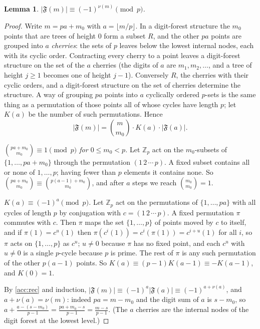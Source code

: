 \documentclass[11pt]{article}
\newtheorem{lemma}[theorem]{Lemma}
\theoremstyle{definition}
\theoremstyle{remark}
\numberwithin{equation}{section}
\numberwithin{figure}{section}
\newcommand{\Z}{\mathbb Z}
\newcommand{\F}{\mathfrak F}
\begin{document}
\begin{lemma}\label{acc:L4}
$|\F(m)|\equiv(-1)^{\nu(m)}\pmod p$.
\end{lemma}
\begin{proof}
Write $m=pa+m_0$ with $a=\lfloor m/p\rfloor$. In a digit-forest structure the $m_0$ points
that are trees of height $0$ form a subset $R$, and the other $pa$ points are grouped into $a$
\emph{cherries}: the sets of $p$ leaves below the lowest internal nodes, each with its cyclic
order. Contracting every cherry to a point leaves a digit-forest structure on the set of the
$a$ cherries (the digits of $a$ are $m_1,m_2,\dots$, and a tree of height $j\ge1$ becomes one
of height $j-1$). Conversely $R$, the cherries with their cyclic orders, and a digit-forest
structure on the set of cherries determine the structure. A way of grouping $pa$ points into
$a$ cyclically ordered $p$-sets is the same thing as a permutation of those points all of
whose cycles have length $p$; let $K(a)$ be the number of such permutations. Hence
\begin{equation}\label{acc:rec}
 |\F(m)|=\binom{m}{m_0}\cdot K(a)\cdot|\F(a)| .
\end{equation}

\emph{$\binom{pa+m_0}{m_0}\equiv1\pmod p$ for $0\le m_0<p$.} Let $\Z_p$ act on the
$m_0$-subsets of $\{1,\dots,pa+m_0\}$ through the permutation $(1\,2\,\cdots\,p)$. A fixed
subset contains all or none of $1,\dots,p$; having fewer than $p$ elements it contains none.
So $\binom{pa+m_0}{m_0}\equiv\binom{p(a-1)+m_0}{m_0}$, and after $a$ steps we reach
$\binom{m_0}{m_0}=1$.

\emph{$K(a)\equiv(-1)^a\pmod p$.} Let $\Z_p$ act on the permutations of $\{1,\dots,pa\}$ with
all cycles of length $p$ by conjugation with $c=(1\,2\,\cdots\,p)$. A fixed permutation $\pi$
commutes with $c$. Then $\pi$ maps the set $\{1,\dots,p\}$ of points moved by $c$ to itself,
and if $\pi(1)=c^u(1)$ then $\pi(c^i(1))=c^i(\pi(1))=c^{i+u}(1)$ for all $i$, so $\pi$ acts on
$\{1,\dots,p\}$ as $c^u$; $u\ne0$ because $\pi$ has no fixed point, and each $c^u$ with
$u\ne0$ is a single $p$-cycle because $p$ is prime. The rest of $\pi$ is any such permutation of the other
$p(a-1)$ points. So $K(a)\equiv(p-1)K(a-1)\equiv-K(a-1)$, and $K(0)=1$.

By \eqref{acc:rec} and induction, $|\F(m)|\equiv(-1)^a|\F(a)|\equiv(-1)^{a+\nu(a)}$, and
$a+\nu(a)=\nu(m)$: indeed $pa=m-m_0$ and the digit sum of $a$ is $s-m_0$, so
$a+\frac{a-(s-m_0)}{p-1}=\frac{pa+m_0-s}{p-1}=\frac{m-s}{p-1}$. (The $a$ cherries are the
internal nodes of the digit forest at the lowest level.)
\end{proof}
\end{document}
